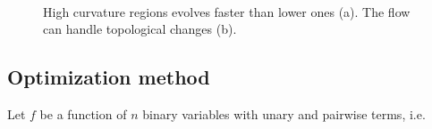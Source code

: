 \documentclass[smallextended]{svjour3}       %
\begin{document}
{\begin{figure}[!h]
\center
{}\\%
\caption{High curvature regions evolves faster than lower ones (a). The flow can handle topological changes (b). }
\label{fig:mx-speed-variation-hole-filling}
\end{figure}


\subsection{Optimization method}

Let $f$ be a function of $n$ binary variables with unary and pairwise terms, i.e.

}
\end{document}

